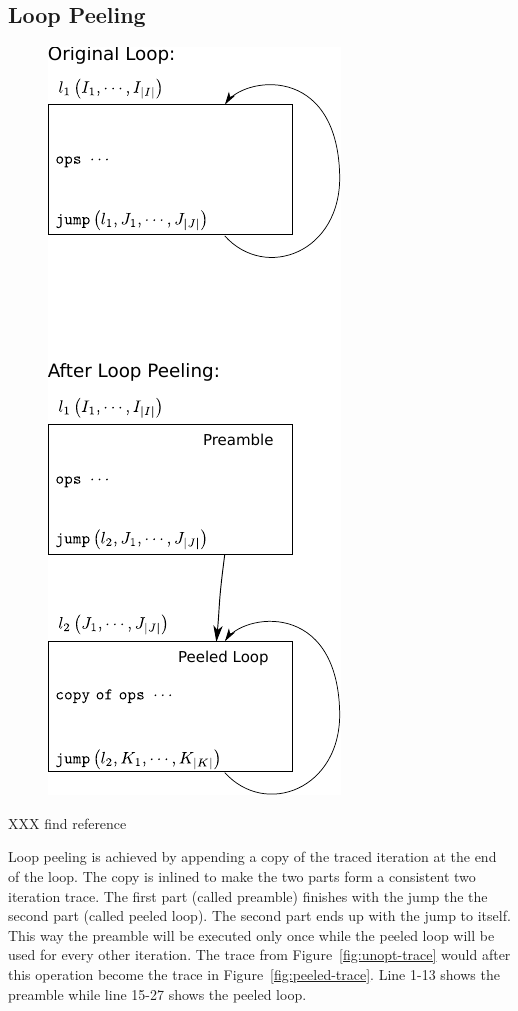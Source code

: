 \documentclass[preprint]{sigplanconf}
\begin{document}
\subsection{Loop Peeling}

\begin{figure}
\begin{center}
\includegraphics[scale=1]{figures/overview}
\end{center}
\end{figure}

XXX find reference

Loop peeling is achieved by appending a copy of the traced iteration at
the end of the loop. The copy  is inlined to make the two parts form a
consistent two iteration trace. 
The first part (called preamble) finishes with the jump the the second part
(called peeled loop). The second part ends up with the jump to itself. This way
the preamble will be executed only once while the peeled loop will
be used for every other iteration.
The trace from Figure~\ref{fig:unopt-trace} would after this operation become
the trace in Figure~\ref{fig:peeled-trace}. Line 1-13 shows the
preamble while line 15-27 shows the peeled loop.
\end{document}
